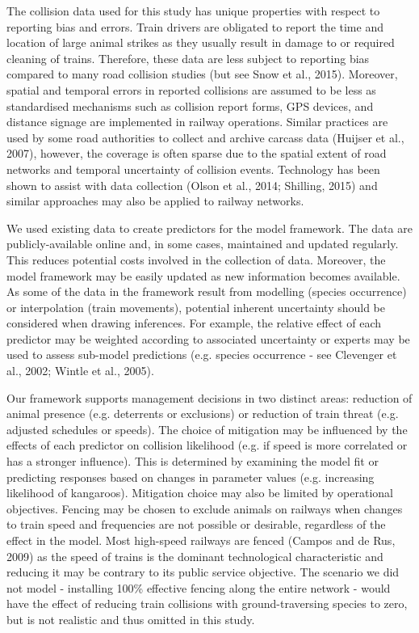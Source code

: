 The collision data used for this study has unique properties with respect to reporting bias and errors.  Train drivers are obligated to report the time and location of large animal strikes as they usually result in damage to or required cleaning of trains.  Therefore, these data are less subject to reporting bias compared to many road collision studies (but see Snow et al., 2015).  Moreover, spatial and temporal errors in reported collisions are assumed to be less as standardised mechanisms such as collision report forms, GPS devices, and distance signage are implemented in railway operations. Similar practices are used by some road authorities to collect and archive carcass data (Huijser et al., 2007), however, the coverage is often sparse due to the spatial extent of road networks and temporal uncertainty of collision events.  Technology has been shown to assist with data collection (Olson et al., 2014; Shilling, 2015) and similar approaches may also be applied to railway networks.

We used existing data to create predictors for the model framework. The data are publicly-available online and, in some cases, maintained and updated regularly. This reduces potential costs involved in the collection of data. Moreover, the model framework may be easily updated as new information becomes available.  As some of the data in the framework result from modelling (species occurrence) or interpolation (train movements), potential inherent uncertainty should be considered when drawing inferences. For example, the relative effect of each predictor may be weighted according to associated uncertainty or experts may be used to assess sub-model predictions (e.g. species occurrence - see Clevenger et al., 2002; Wintle et al., 2005).

Our framework supports management decisions in two distinct areas: reduction of animal presence (e.g. deterrents or exclusions) or reduction of train threat (e.g. adjusted schedules or speeds).  The choice of mitigation may be influenced by the effects of each predictor on collision likelihood (e.g. if speed is more correlated or has a stronger influence).  This is determined by examining the model fit or predicting responses based on changes in parameter values (e.g. increasing likelihood of kangaroos).  Mitigation choice may also be limited by operational objectives.  Fencing may be chosen to exclude animals on railways when changes to train speed and frequencies are not possible or desirable, regardless of the effect in the model. Most high-speed railways are fenced (Campos and de Rus, 2009) as the speed of trains is the dominant technological characteristic and reducing it may be contrary to its public service objective. The scenario we did not model - installing 100\% effective fencing along the entire network - would have the effect of reducing train collisions with ground-traversing species to zero, but is not realistic and thus omitted in this study.


